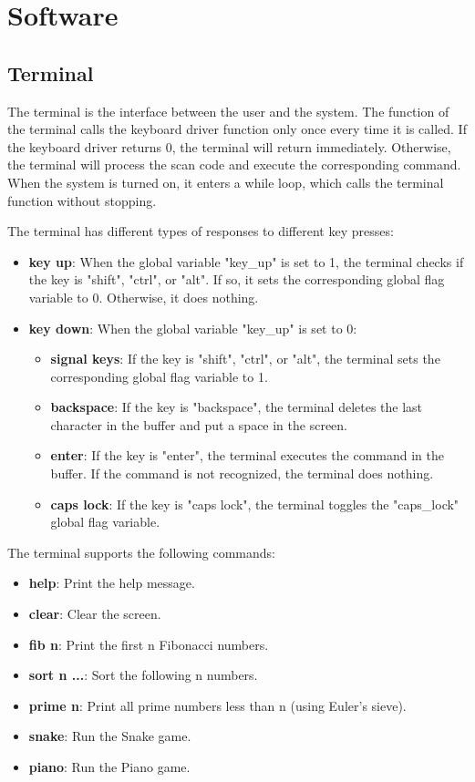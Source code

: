 \documentclass[
	a4paper, %
	11pt, %
]{CSUniSchoolLabReport}
\begin{document}
\section{Software}
\subsection{Terminal}
The terminal is the interface between the user and the system. The function of the terminal calls the keyboard driver function only once every time it is called. If the keyboard driver returns 0, the terminal will return immediately. Otherwise, the terminal will process the scan code and execute the corresponding command. When the system is turned on, it enters a while loop, which calls the terminal function without stopping.

The terminal has different types of responses to different key presses:
\begin{itemize}
    \item \textbf{key up}: When the global variable "key\_up" is set to 1, the terminal checks if the key is "shift", "ctrl", or "alt". If so, it sets the corresponding global flag variable to 0. Otherwise, it does nothing.
    \item \textbf{key down}: When the global variable "key\_up" is set to 0:
          \begin{itemize}
              \item \textbf{signal keys}: If the key is "shift", "ctrl", or "alt", the terminal sets the corresponding global flag variable to 1.
              \item \textbf{backspace}: If the key is "backspace", the terminal deletes the last character in the buffer and put a space in the screen.
              \item \textbf{enter}: If the key is "enter", the terminal executes the command in the buffer. If the command is not recognized, the terminal does nothing.
              \item \textbf{caps lock}: If the key is "caps lock", the terminal toggles the "caps\_lock" global flag variable.
          \end{itemize}
\end{itemize}
The terminal supports the following commands:
\begin{itemize}
    \item \textbf{help}: Print the help message.
    \item \textbf{clear}: Clear the screen.
    \item \textbf{fib n}: Print the first n Fibonacci numbers.
    \item \textbf{sort n ...}: Sort the following n numbers.
    \item \textbf{prime n}: Print all prime numbers less than n (using Euler's sieve).
    \item \textbf{snake}: Run the Snake game.
    \item \textbf{piano}: Run the Piano game.
\end{itemize}
\end{document}
